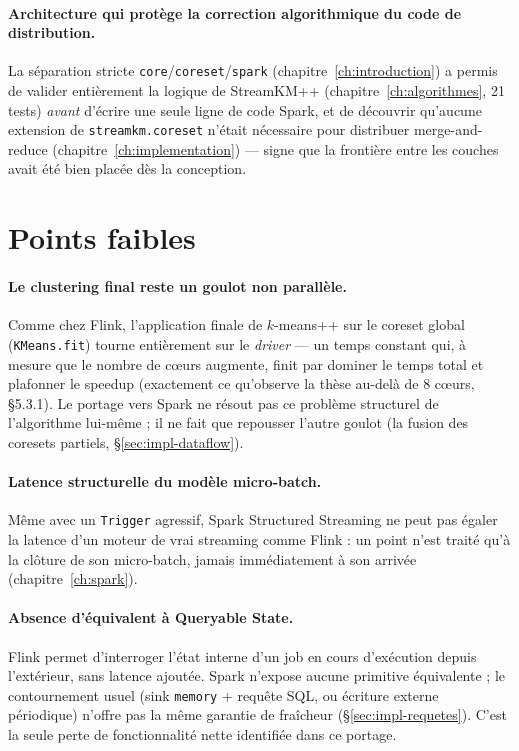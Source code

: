 \paragraph{Architecture qui protège la correction algorithmique du code de
distribution.} La séparation stricte \texttt{core}/\texttt{coreset}/\texttt{spark}
(chapitre~\ref{ch:introduction}) a permis de valider entièrement la logique
de StreamKM++ (chapitre~\ref{ch:algorithmes}, 21 tests) \emph{avant}
d'écrire une seule ligne de code Spark, et de découvrir qu'aucune extension
de \texttt{streamkm.coreset} n'était nécessaire pour distribuer
merge-and-reduce (chapitre~\ref{ch:implementation}) --- signe que la
frontière entre les couches avait été bien placée dès la conception.

\section{Points faibles}

\paragraph{Le clustering final reste un goulot non parallèle.} Comme chez
Flink, l'application finale de $k$-means++ sur le coreset global
(\texttt{KMeans.fit}) tourne entièrement sur le \emph{driver} --- un temps
constant qui, à mesure que le nombre de c\oe{}urs augmente, finit par dominer le
temps total et plafonner le speedup (exactement ce qu'observe la thèse
au-delà de 8 c\oe{}urs, §5.3.1). Le portage vers Spark ne résout pas ce
problème structurel de l'algorithme lui-même ; il ne fait que repousser
l'autre goulot (la fusion des coresets partiels,
§\ref{sec:impl-dataflow}).

\paragraph{Latence structurelle du modèle micro-batch.} Même avec un
\texttt{Trigger} agressif, Spark Structured Streaming ne peut pas égaler la
latence d'un moteur de vrai streaming comme Flink : un point n'est traité
qu'à la clôture de son micro-batch, jamais immédiatement à son arrivée
(chapitre~\ref{ch:spark}).

\paragraph{Absence d'équivalent à Queryable State.} Flink permet d'interroger
l'état interne d'un job en cours d'exécution depuis l'extérieur, sans
latence ajoutée. Spark n'expose aucune primitive équivalente ; le
contournement usuel (sink \texttt{memory} + requête SQL, ou écriture externe
périodique) n'offre pas la même garantie de fraîcheur
(§\ref{sec:impl-requetes}). C'est la seule perte de fonctionnalité nette
identifiée dans ce portage.

